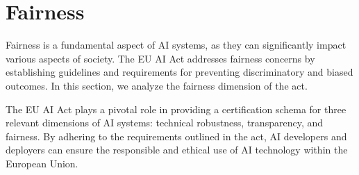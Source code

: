 \documentclass{article}
\begin{document}
\section{Fairness}

Fairness is a fundamental aspect of AI systems, as they can significantly impact various aspects of society. The EU AI Act addresses fairness concerns by establishing guidelines and requirements for preventing discriminatory and biased outcomes. In this section, we analyze the fairness dimension of the act.

The EU AI Act plays a pivotal role in providing a certification schema for three relevant dimensions of AI systems: technical robustness, transparency, and fairness. By adhering to the requirements outlined in the act, AI developers and deployers can ensure the responsible and ethical use of AI technology within the European Union.
\end{document}
